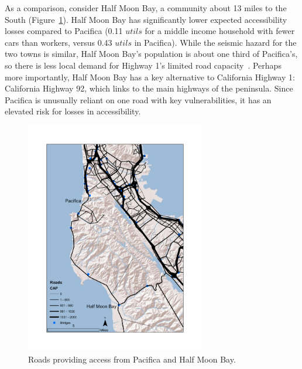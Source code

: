 As a comparison, consider Half Moon Bay, a community about 13 miles to the South (Figure~\ref{fig:pac}). Half Moon Bay has significantly lower expected accessibility losses compared to Pacifica (0.11 $utils$ for a middle income household with fewer cars than workers, versus 0.43 $utils$ in Pacifica). %
While the seismic hazard for the two towns is similar, Half Moon Bay's population is about one third of Pacifica's, so there is less local demand for Highway 1's limited road capacity~\cite{u.s._bureau_of_the_census_united_2010}. Perhaps more importantly, Half Moon Bay has a key alternative to California Highway 1: California Highway 92, which links to the main highways of the peninsula. %
Since Pacifica is unusually reliant on one road with key vulnerabilities, it has an elevated risk for losses in accessibility.
\begin{figure}[!ht]
    \centering
    \includegraphics[height=4in]{FIGS/equity_hmb.pdf} 
\caption{Roads providing access from Pacifica and Half Moon Bay.}
\label{fig:pac}
\end{figure}




